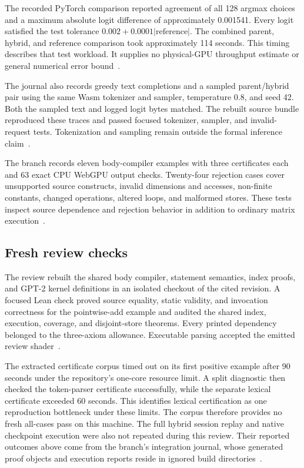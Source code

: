 \documentclass[11pt]{article}
\begin{document}
The recorded PyTorch comparison reported agreement of all 128 argmax choices and a maximum absolute logit difference of approximately 0.001541.  Every logit satisfied the test tolerance $0.002+0.0001|\text{reference}|$.  The combined parent, hybrid, and reference comparison took approximately 114 seconds.  This timing describes that test workload.  It supplies no physical-GPU throughput estimate or general numerical error bound~\cite{journal,tests}.

The journal also records greedy text completions and a sampled parent/hybrid pair using the same Wasm tokenizer and sampler, temperature 0.8, and seed 42.  Both the sampled text and logged logit bytes matched.  The rebuilt source bundle reproduced these traces and passed focused tokenizer, sampler, and invalid-request tests.  Tokenization and sampling remain outside the formal inference claim~\cite{journal}.

The branch records eleven body-compiler examples with three certificates each and 63 exact CPU WebGPU output checks.  Twenty-four rejection cases cover unsupported source constructs, invalid dimensions and accesses, non-finite constants, changed operations, altered loops, and malformed stores.  These tests inspect source dependence and rejection behavior in addition to ordinary matrix execution~\cite{bodytests}.

\subsection{Fresh review checks}

The review rebuilt the shared body compiler, statement semantics, index proofs, and GPT-2 kernel definitions in an isolated checkout of the cited revision.  A focused Lean check proved source equality, static validity, and invocation correctness for the pointwise-add example and audited the shared index, execution, coverage, and disjoint-store theorems.  Every printed dependency belonged to the three-axiom allowance.  Executable parsing accepted the emitted review shader~\cite{review}.

The extracted certificate corpus timed out on its first positive example after 90 seconds under the repository's one-core resource limit.  A split diagnostic then checked the token-parser certificate successfully, while the separate lexical certificate exceeded 60 seconds.  This identifies lexical certification as one reproduction bottleneck under these limits.  The corpus therefore provides no fresh all-cases pass on this machine.  The full hybrid session replay and native checkpoint execution were also not repeated during this review.  Their reported outcomes above come from the branch's integration journal, whose generated proof objects and execution reports reside in ignored build directories~\cite{review,journal}.
\end{document}
